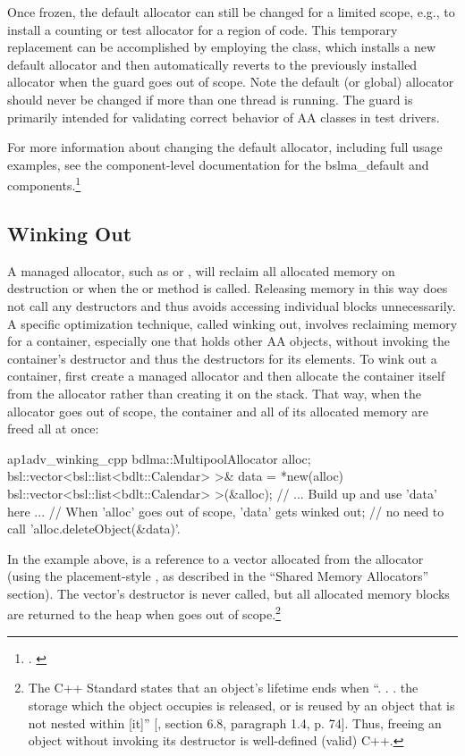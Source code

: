 Once frozen, the default allocator can still be changed for a limited scope, e.g.,
to install a counting or test allocator for a region of code. This temporary
replacement can be accomplished by employing the 
 class, which installs a new default allocator
and then automatically reverts to the previously installed allocator when the
guard goes out of scope. Note the default (or global) allocator should never be
changed if more than one thread is running. The guard is primarily intended
for validating correct behavior of AA classes in test drivers.

For more information about changing the default allocator, including full usage
examples, see the component-level documentation for the bslma_default and
 components.\footnote{\cite{bloomberga}. \cite{bloombergb}}


\subsection{Winking Out}
A managed allocator, such as  or
, will reclaim all allocated memory on destruction
or when the  or  method is called. Releasing memory in this
way does not call any destructors and thus avoids accessing individual blocks
unnecessarily. A specific optimization technique, called winking out, involves
reclaiming memory for a container, especially one that holds other AA objects,
without invoking the container’s destructor and thus the destructors for its
elements. To wink out a container, first create a managed allocator and then
allocate the container itself from the allocator rather than creating it on the
stack. That way, when the allocator goes out of scope, the container and all of
its allocated memory are freed all at once:
\begin{cppcodeblock}{ap1adv_winking_cpp}
    {
        bdlma::MultipoolAllocator alloc;
        bsl::vector<bsl::list<bdlt::Calendar> >& data =
            *new(alloc) bsl::vector<bsl::list<bdlt::Calendar> >(&alloc);
        // ... Build up and use 'data' here ...
        // When 'alloc' goes out of scope, 'data' gets winked out;
        // no need to call 'alloc.deleteObject(&data)'.
    }
\end{cppcodeblock}
In the example above,  is a reference to a vector allocated from the
allocator (using the placement-style , as described in the “Shared
Memory Allocators” section). The vector’s destructor is never called, but all
allocated memory blocks are returned to the heap when  goes out of
scope.\footnote{The C++ Standard states that an object’s lifetime ends when “. . . the storage which the
object occupies is released, or is reused by an object that is not nested within [it]” [\cite{cpp17},
section 6.8, paragraph 1.4, p. 74]. Thus, freeing an object without invoking its destructor is
well-defined (valid) C++.}


